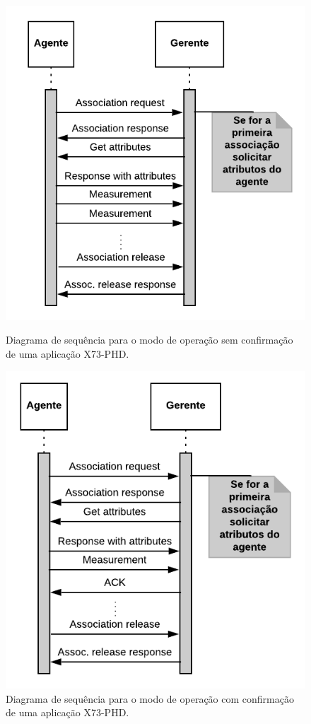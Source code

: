 \begin{figure}[htbp]
\centering
\begin{minipage}{.5\textwidth}
\centering
\includegraphics[width=.8\textwidth]{figures/unconfirmed.png}
\caption{Diagrama de sequência para o modo de operação sem confirmação de uma aplicação X73-PHD.}
\label{fig:unconfirmedMode}
\end{minipage}%
\begin{minipage}{.5\textwidth}
\centering
\includegraphics[width=.8\textwidth]{figures/confirmed.png}
\caption{Diagrama de sequência para o modo de operação com confirmação de uma aplicação X73-PHD.}
\label{fig:confirmedMode} 
\end{minipage}%
\end{figure}


